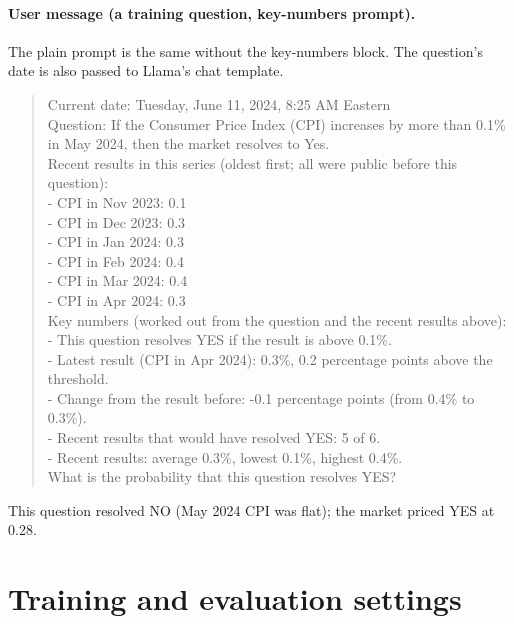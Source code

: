 \documentclass[11pt]{article}
\begin{document}
\paragraph{User message (a training question, key-numbers prompt).} The plain prompt is the same without the key-numbers block. The question's date is also passed to Llama's chat template.
\begin{quote}\footnotesize\ttfamily\raggedright
Current date: Tuesday, June 11, 2024, 8:25 AM Eastern\\[3pt]
Question: If the Consumer Price Index (CPI) increases by more than 0.1\% in May 2024, then the market resolves to Yes.\\[3pt]
Recent results in this series (oldest first; all were public before this question):\\
- CPI in Nov 2023: 0.1\\
- CPI in Dec 2023: 0.3\\
- CPI in Jan 2024: 0.3\\
- CPI in Feb 2024: 0.4\\
- CPI in Mar 2024: 0.4\\
- CPI in Apr 2024: 0.3\\[3pt]
Key numbers (worked out from the question and the recent results above):\\
- This question resolves YES if the result is above 0.1\%.\\
- Latest result (CPI in Apr 2024): 0.3\%, 0.2 percentage points above the threshold.\\
- Change from the result before: -0.1 percentage points (from 0.4\% to 0.3\%).\\
- Recent results that would have resolved YES: 5 of 6.\\
- Recent results: average 0.3\%, lowest 0.1\%, highest 0.4\%.\\[3pt]
What is the probability that this question resolves YES?
\end{quote}
This question resolved NO (May 2024 CPI was flat); the market priced YES at 0.28.

\section{Training and evaluation settings}
\label{app:hyper}
\end{document}
